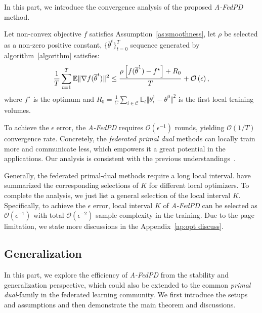 In this part, we introduce the convergence analysis of the proposed \textit{A-FedPD} method.
\begin{theorem}
    Let non-convex objective $f$ satisfies Assumption~\ref{as:smoothness}, let $\rho$ be selected as a non-zero positive constant, $\{\overline{\theta}^t\}_{t=0}^{T}$ sequence generated by algorithm~\ref{algorithm} satisfies:
    \begin{equation}
    \small
    \frac{1}{T}\sum_{t=1}^{T}\mathbb{E}\Vert\nabla f(\overline{\theta}^{t})\Vert^2 
    \leq \frac{\rho\left[ f(\overline{\theta}^1) - f^\star\right] + R_{0}}{T} + \mathcal{O}\left(\epsilon\right),
    \end{equation}
    where $f^\star$ is the optimum and $R_{0} = \frac{1}{C}\sum_{i\in\mathcal{C}}\mathbb{E}_t\Vert\theta_i^{1} - \theta^{0}\Vert^2$ is the first local training volumes.
\end{theorem}
\begin{remark}
    To achieve the $\epsilon$ error, the \textit{A-FedPD} requires $\mathcal{O}(\epsilon^{-1})$ rounds, yielding $\mathcal{O}(1/T)$ convergence rate. Concretely, the \textit{federated primal dual} methods can locally train more and communicate less, which empowers it a great potential in the applications. Our analysis is consistent with the previous understandings~\citep{zhang2021fedpd,durmus2021federated,gong2022fedadmm,li2023dfedadmm}.
\end{remark}

\begin{remark}
     Generally, the federated primal-dual methods require a long local interval. \citet{zhang2021fedpd,gong2022fedadmm,wang2022fedadmm} have summarized the corresponding selections of $K$ for different local optimizers. To complete the analysis, we just list a general selection of the local interval $K$. Specifically, to achieve the $\epsilon$ error, local interval $K$ of \textit{A-FedPD} can be selected as $\mathcal{O}(\epsilon^{-1})$ with total $\mathcal{O}(\epsilon^{-2})$ sample complexity in the training. Due to the page limitation, we state more discussions in the Appendix~\ref{ap:opt discuss}.
\end{remark}

\subsection{Generalization}
\label{Generalization}
In this part, we explore the efficiency of \textit{A-FedPD} from the stability and generalization perspective, which could also be extended to the common \textit{primal dual}-family in the federated learning community. We first introduce the setups and assumptions and then demonstrate the main theorem and discussions.

